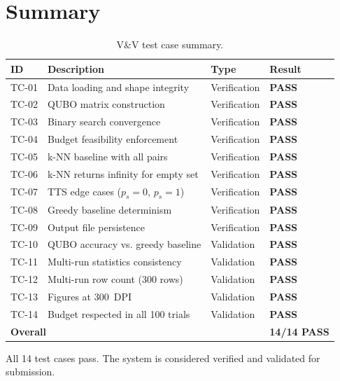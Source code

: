\documentclass[12pt,a4paper]{article}
\newcommand{\pass}{\textcolor{green!50!black}{\textbf{PASS}}}
\begin{document}
\section{Summary}

\begin{table}[h!]
\centering
\renewcommand{\arraystretch}{1.3}
\begin{tabular}{@{}llll@{}}
\toprule
\textbf{ID} & \textbf{Description} & \textbf{Type} & \textbf{Result} \\
\midrule
TC-01 & Data loading and shape integrity       & Verification & \pass \\
TC-02 & QUBO matrix construction               & Verification & \pass \\
TC-03 & Binary search convergence              & Verification & \pass \\
TC-04 & Budget feasibility enforcement         & Verification & \pass \\
TC-05 & k-NN baseline with all pairs           & Verification & \pass \\
TC-06 & k-NN returns infinity for empty set    & Verification & \pass \\
TC-07 & TTS edge cases ($p_s = 0$, $p_s = 1$) & Verification & \pass \\
TC-08 & Greedy baseline determinism            & Verification & \pass \\
TC-09 & Output file persistence                & Verification & \pass \\
TC-10 & QUBO accuracy vs. greedy baseline      & Validation   & \pass \\
TC-11 & Multi-run statistics consistency       & Validation   & \pass \\
TC-12 & Multi-run row count (300 rows)         & Validation   & \pass \\
TC-13 & Figures at 300~DPI                     & Validation   & \pass \\
TC-14 & Budget respected in all 100 trials     & Validation   & \pass \\
\midrule
\multicolumn{3}{l}{\textbf{Overall}} & \textbf{14/14 PASS} \\
\bottomrule
\end{tabular}
\caption{V\&V test case summary.}
\end{table}

All 14 test cases pass. The system is considered verified and validated
for submission.
\end{document}
